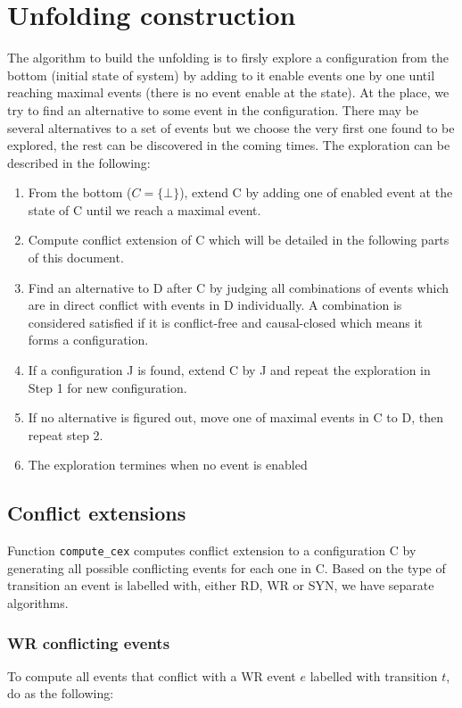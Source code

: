 \documentclass{llncs}
\begin{document}
\section{Unfolding construction}
The algorithm to build the unfolding is to firsly explore a configuration from the bottom (initial state of system) by adding to it enable events one by one until reaching maximal events (there is no event enable at the state). At the place, we try to find an alternative to some event in the configuration. There may be several alternatives to a set of events but we choose the very first one found to be explored, the rest can be discovered in the coming times.
The exploration can be described in the following: 
\begin{enumerate}
\item 
	From the bottom ($C = \{\bot\}$), extend C by adding one of enabled event at the state of C until we reach a maximal
	event.
\item
	Compute conflict extension of C which will be detailed in the following parts of this document.
\item
	Find an alternative to D after C by judging all combinations of events which are in direct conflict with
	events in D individually. A combination is considered satisfied if it is conflict-free and causal-closed which means it
	forms a configuration.
\item
	If a configuration J is found, extend C by J and repeat the exploration in Step 1 for new configuration.
\item
	If no alternative is figured out, move one of maximal events in C to D, then repeat step 2.
\item
	The exploration termines when no event is enabled
\end{enumerate}

\subsection{Conflict extensions}
\label{s:cex}
Function \verb!compute_cex! computes conflict extension to a configuration C by generating all possible conflicting events for each one in C. Based on the type of transition an event is labelled with, either RD, WR or SYN, we have separate algorithms. 
\subsubsection{WR conflicting events}
\noindent
To compute all events that conflict with a WR event $e$ labelled with transition $t$, do as the following:
\end{document}
